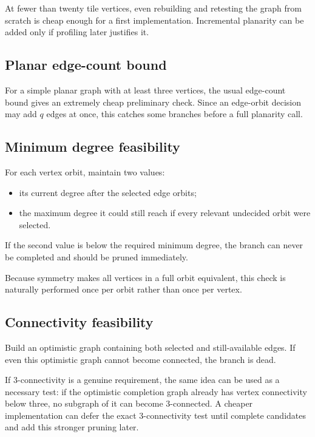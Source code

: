 \documentclass[11pt]{article}
\begin{document}
At fewer than twenty tile vertices, even rebuilding and retesting the graph from scratch is cheap enough for a first implementation. Incremental planarity can be added only if profiling later justifies it.

\subsection{Planar edge-count bound}

For a simple planar graph with at least three vertices, the usual edge-count bound gives an extremely cheap preliminary check. Since an edge-orbit decision may add \(q\) edges at once, this catches some branches before a full planarity call.

\subsection{Minimum degree feasibility}

For each vertex orbit, maintain two values:
\begin{itemize}
  \item its current degree after the selected edge orbits;
  \item the maximum degree it could still reach if every relevant undecided orbit were selected.
\end{itemize}

If the second value is below the required minimum degree, the branch can never be completed and should be pruned immediately.

Because symmetry makes all vertices in a full orbit equivalent, this check is naturally performed once per orbit rather than once per vertex.

\subsection{Connectivity feasibility}

Build an optimistic graph containing both selected and still-available edges. If even this optimistic graph cannot become connected, the branch is dead.

If 3-connectivity is a genuine requirement, the same idea can be used as a necessary test: if the optimistic completion graph already has vertex connectivity below three, no subgraph of it can become 3-connected. A cheaper implementation can defer the exact 3-connectivity test until complete candidates and add this stronger pruning later.
\end{document}
